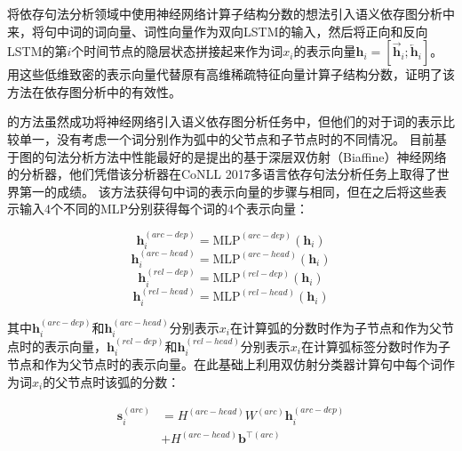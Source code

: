将依存句法分析领域中使用神经网络计算子结构分数的想法引入语义依存图分析中来，将句中词的词向量、词性向量作为双向LSTM的输入，然后将正向和反向LSTM的第$i$个时间节点的隐层状态拼接起来作为词$x_i$的表示向量$\mathbf{h}_i=[\overrightarrow{\mathbf{h}}_i;\overleftarrow{\mathbf{h}}_i]$。用这些低维致密的表示向量代替原有高维稀疏特征向量计算子结构分数，证明了该方法在依存图分析中的有效性。

的方法虽然成功将神经网络引入语义依存图分析任务中，但他们的对于词的表示比较单一，没有考虑一个词分别作为弧中的父节点和子节点时的不同情况。
目前基于图的句法分析方法中性能最好的是提出的基于深层双仿射（Biaffine）神经网络的分析器，他们凭借该分析器在CoNLL 2017多语言依存句法分析任务上取得了世界第一的成绩。
该方法获得句中词的表示向量的步骤与相同，但在之后将这些表示输入4个不同的MLP分别获得每个词的4个表示向量：

\begin{equation}
\label{eq:arc-dep}
\mathbf{h}^{(arc-dep)}_i = \text{MLP}^{(arc-dep)}(\mathbf{h}_i)
\end{equation}
\begin{equation}
\label{eq:arc-head}
\mathbf{h}^{(arc-head)}_i = \text{MLP}^{(arc-head)}(\mathbf{h}_i)
\end{equation}
\begin{equation}
\label{eq:rel-dep}
\mathbf{h}^{(rel-dep)}_i = \text{MLP}^{(rel-dep)}(\mathbf{h}_i)
\end{equation}
\begin{equation}
\label{eq:rel-head}
\mathbf{h}^{(rel-head)}_i = \text{MLP}^{(rel-head)}(\mathbf{h}_i)
\end{equation}

其中$\mathbf{h}^{(arc-dep)}_i$和$\mathbf{h}^{(arc-head)}_i$分别表示$x_i$在计算弧的分数时作为子节点和作为父节点时的表示向量，$\mathbf{h}^{(rel-dep)}_i$和$\mathbf{h}^{(rel-head)}_i$分别表示$x_i$在计算弧标签分数时作为子节点和作为父节点时的表示向量。在此基础上利用双仿射分类器计算句中每个词作为词$x_i$的父节点时该弧的分数：

\begin{equation}
\begin{split}
\mathbf{s}^{(arc)}_i & = H^{(arc-head)}W^{(arc)}\mathbf{h}^{(arc-dep)}_i \\
& + H^{(arc-head)}\mathbf{b}^{\top(arc)}
\end{split}
\end{equation}


